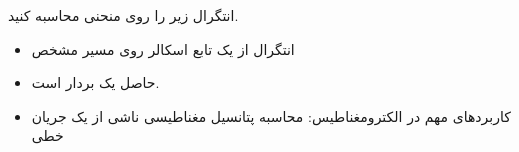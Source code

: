 
\begin{ELexample}{}

انتگرال زیر را روی منحنی  محاسبه کنید.


\begin{ELsolution}



\end{ELsolution}

\end{ELexample}

\begin{ELunit}

\begin{itemize}
\tightlist
\item
  انتگرال از یک تابع اسکالر روی مسیر مشخص
\end{itemize}


\begin{itemize}
\tightlist
\item
  حاصل یک بردار است.
\item
  کاربردهای مهم در الکترومغناطیس: محاسبه پتانسیل مغناطیسی ناشی از یک جریان خطی
\end{itemize}


\end{ELunit}


